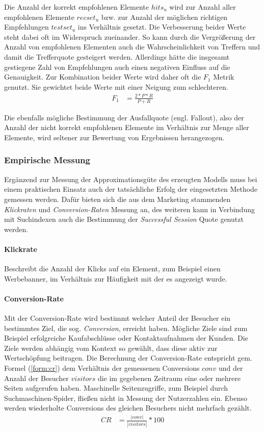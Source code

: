 Die Anzahl der korrekt empfohlenen Elemente $hits_u$ wird zur Anzahl aller empfohlenen Elemente $recset_u$ bzw. zur Anzahl der möglichen richtigen Empfehlungen $testset_u$ ins Verhältnis gesetzt. Die Verbesserung beider Werte steht dabei oft im Widerspruch zueinander. So kann durch die Vergrößerung der Anzahl von empfohlenen Elementen auch die Wahrscheinlichkeit von Treffern und damit die Trefferquote gesteigert werden. Allerdings hätte die insgesamt gestiegene Zahl von Empfehlungen auch einen negativen Einfluss auf die Genauigkeit. Zur Kombination beider Werte wird daher oft die $F_1$ Metrik genutzt. Sie gewichtet beide Werte mit einer Neigung zum schlechteren.
\begin{align}
F_1 & = \frac{2 * P * R}{P+R} \label{form:f1}
\end{align}

Die ebenfalls mögliche Bestimmung der Ausfallquote (engl. Fallout), also der Anzahl der nicht korrekt empfohlenen Elemente im Verhältnis zur Menge aller Elemente, wird seltener zur Bewertung von Ergebnissen herangezogen. \citep{hb_08,rs}

\subsubsection{Empirische Messung}

Ergänzend zur Messung der Approximationsgüte des erzeugten Modells muss bei einem praktischen Einsatz auch der tatsächliche Erfolg der eingesetzten Methode gemessen werden. Dafür bieten sich die aus dem Marketing stammenden \textit{Klickraten} und \textit{Conversion-Raten} Messung an, des weiteren kann in Verbindung mit Suchindexen auch die Bestimmung der \textit{Successful Session} Quote genutzt werden.

\paragraph{Klickrate} Beschreibt die Anzahl der Klicks auf ein Element, zum Beispiel einen Werbebanner, im Verhältnis zur Häufigkeit mit der es angezeigt wurde. 

\paragraph{Conversion-Rate} Mit der Conversion-Rate wird bestimmt welcher Anteil der Besucher ein bestimmtes Ziel, die sog. \textit{Conversion}, erreicht haben. Mögliche Ziele sind zum Beispiel erfolgreiche Kaufabschlüsse oder Kontaktaufnahmen der Kunden. Die Ziele werden abhängig vom Kontext so gewählt, dass diese aktiv zur Wertschöpfung beitragen. Die Berechnung der Conversion-Rate entspricht gem. Formel (\ref{form:cr}) dem Verhältnis der gemessenen Conversions $conv$ und der Anzahl der Besucher $visitors$ die im gegebenen Zeitraum eine oder mehrere Seiten aufgerufen haben. Maschinelle Seitenzugriffe, zum Beispiel durch Suchmaschinen-Spider, fließen nicht in Messung der Nutzerzahlen ein. Ebenso werden wiederholte Conversions des gleichen Besuchers nicht mehrfach gezählt. \citep{krueger2011conversion}
\begin{align}
CR & = \frac{|conv|}{|visitors| } * 100 \label{form:cr}
\end{align}

